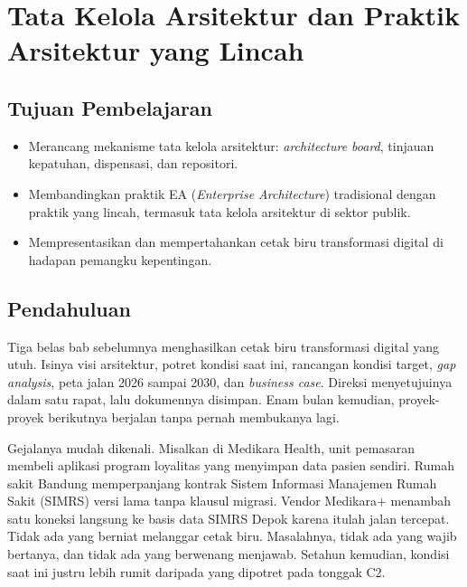 \chapter{Tata Kelola Arsitektur dan Praktik Arsitektur yang Lincah}

\section*{Tujuan Pembelajaran}
\begin{itemize}
  \item Merancang mekanisme tata kelola arsitektur: \textit{architecture board}, tinjauan kepatuhan, dispensasi, dan repositori.
  \item Membandingkan praktik EA (\textit{Enterprise Architecture}) tradisional dengan praktik yang lincah, termasuk tata kelola arsitektur di sektor publik.
  \item Mempresentasikan dan mempertahankan cetak biru transformasi digital di hadapan pemangku kepentingan.
\end{itemize}

\section{Pendahuluan}

Tiga belas bab sebelumnya menghasilkan cetak biru transformasi digital yang
utuh. Isinya visi arsitektur, potret kondisi saat ini, rancangan kondisi
target, \textit{gap analysis}, peta jalan 2026 sampai 2030, dan
\textit{business case}. Direksi menyetujuinya dalam satu rapat, lalu
dokumennya disimpan. Enam bulan kemudian, proyek-proyek berikutnya berjalan
tanpa pernah membukanya lagi.

Gejalanya mudah dikenali. Misalkan di Medikara Health, unit pemasaran membeli
aplikasi program loyalitas yang menyimpan data pasien sendiri. Rumah sakit
Bandung memperpanjang kontrak Sistem Informasi Manajemen Rumah Sakit (SIMRS)
versi lama tanpa klausul migrasi. Vendor Medikara+ menambah satu koneksi
langsung ke basis data SIMRS Depok karena itulah jalan tercepat. Tidak ada
yang berniat melanggar cetak biru. Masalahnya, tidak ada yang wajib bertanya,
dan tidak ada yang berwenang menjawab. Setahun kemudian, kondisi saat ini
justru lebih rumit daripada yang dipotret pada tonggak C2.

